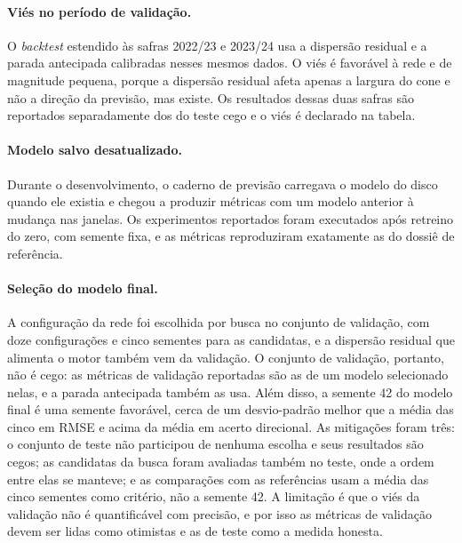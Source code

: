 \paragraph{Viés no período de validação.} O \textit{backtest} estendido às safras 2022/23 e 2023/24 usa a dispersão residual e a parada antecipada calibradas nesses mesmos dados. O viés é favorável à rede e de magnitude pequena, porque a dispersão residual afeta apenas a largura do cone e não a direção da previsão, mas existe. Os resultados dessas duas safras são reportados separadamente dos do teste cego e o viés é declarado na tabela.

\paragraph{Modelo salvo desatualizado.} Durante o desenvolvimento, o caderno de previsão carregava o modelo do disco quando ele existia e chegou a produzir métricas com um modelo anterior à mudança nas janelas. Os experimentos reportados foram executados após retreino do zero, com semente fixa, e as métricas reproduziram exatamente as do dossiê de referência.

\paragraph{Seleção do modelo final.} A configuração da rede foi escolhida por busca no conjunto de validação, com doze configurações e cinco sementes para as candidatas, e a dispersão residual que alimenta o motor também vem da validação. O conjunto de validação, portanto, não é cego: as métricas de validação reportadas são as de um modelo selecionado nelas, e a parada antecipada também as usa. Além disso, a semente 42 do modelo final é uma semente favorável, cerca de um desvio-padrão melhor que a média das cinco em RMSE e acima da média em acerto direcional. As mitigações foram três: o conjunto de teste não participou de nenhuma escolha e seus resultados são cegos; as candidatas da busca foram avaliadas também no teste, onde a ordem entre elas se manteve; e as comparações com as referências usam a média das cinco sementes como critério, não a semente 42. A limitação é que o viés da validação não é quantificável com precisão, e por isso as métricas de validação devem ser lidas como otimistas e as de teste como a medida honesta.

